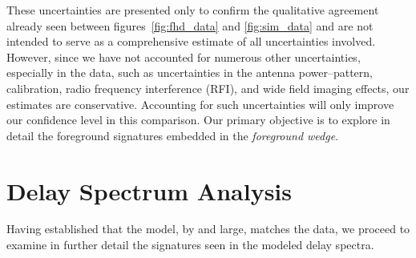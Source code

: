 \documentclass[preprint2,iop,numberedappendix]{emulateapj}
\begin{document}
\begin{figure}[htb]
\end{figure}

These uncertainties are presented only to confirm the qualitative agreement already seen between figures~\ref{fig:fhd_data} and \ref{fig:sim_data} and are not intended to serve as a comprehensive estimate of all uncertainties involved. However, since we have not accounted for numerous other uncertainties, especially in the data, such as uncertainties in the antenna power--pattern, calibration, radio frequency interference (RFI), and wide field imaging effects, our estimates are conservative. Accounting for such uncertainties will only improve our confidence level in this comparison. Our primary objective is to explore in detail the foreground signatures embedded in the {\it foreground wedge}.

\section{Delay Spectrum Analysis}\label{sec:delay-spectrum-analysis}

Having established that the model, by and large, matches the data, we proceed to examine in further detail the signatures seen in the modeled delay spectra. 
\end{document}
